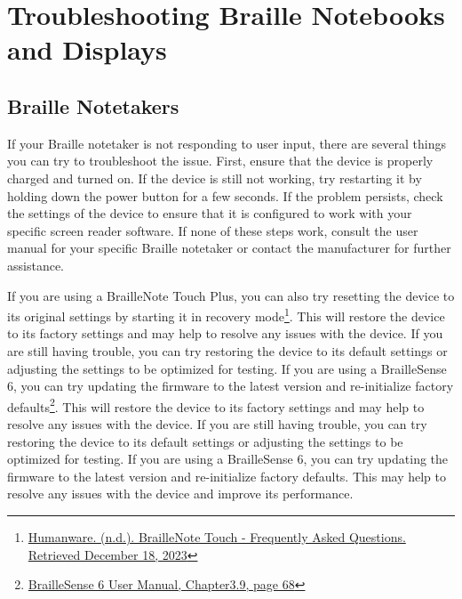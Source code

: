 \hypertarget{trouble2}{}\chapter[\hfill\break\raggedright Troubleshooting Braille Notebooks and Displays]{Troubleshooting Braille Notebooks and Displays}\label{trouble2}
\noindent\makebox[\linewidth]{\rule{\linewidth}{0.4pt}}
{\let\clearpage\relax\localtableofcontents}\newpage
\hypertarget{notebook2}{}\section{Braille Notetakers}\label{notebook}
If your Braille notetaker is not responding to user input, there are several things you can try to troubleshoot the issue. First, ensure that the device is properly charged and turned on. If the device is still not working, try restarting it by holding down the power button for a few seconds. If the problem persists, check the settings of the device to ensure that it is configured to work with your specific screen reader software. If none of these steps work, consult the user manual for your specific Braille notetaker or contact the manufacturer for further assistance.

If you are using a BrailleNote Touch Plus, you can also try resetting the device to its original settings by starting it in recovery mode\footnote{\raggedright \href{http://www.humanware.com/microsite/bntouch/faq.php}{Humanware. (n.d.). BrailleNote Touch - Frequently Asked Questions. Retrieved December 18, 2023}}. This will restore the device to its factory settings and may help to resolve any issues with the device. If you are still having trouble, you can try restoring the device to its default settings or adjusting the settings to be optimized for testing. If you are using a BrailleSense 6, you can try updating the firmware to the latest version and re-initialize factory defaults\footnote{\raggedright \href{http://hims-inc.com/wp-content/uploads/2023/11/BrailleSense-6-User-Manual-V2-1.pdf}{BrailleSense 6 User Manual, Chapter3.9, page 68}}. This will restore the device to its factory settings and may help to resolve any issues with the device. If you are still having trouble, you can try restoring the device to its default settings or adjusting the settings to be optimized for testing. If you are using a BrailleSense 6, you can try updating the firmware to the latest version and re-initialize factory defaults\footnotemark[\value{footnote}]. This may help to resolve any issues with the device and improve its performance.

